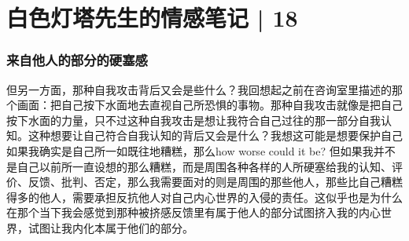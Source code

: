\chapter{白色灯塔先生的情感笔记 | 18}






















\subsection*{来自他人的部分的硬塞感}

但另一方面，那种自我攻击背后又会是些什么？我回想起之前在咨询室里描述的那个画面：把自己按下水面地去直视自己所恐惧的事物。那种自我攻击就像是把自己按下水面的力量，只不过这种自我攻击是想让我符合自己过往的那一部分自我认知。这种想要让自己符合自我认知的背后又会是什么？我想这可能是想要保护自己\pozhehao{}如果我确实是自己所一如既往地糟糕，那么how worse could it be? 但如果我并不是自己以前所一直设想的那么糟糕，而是周围各种各样的人所硬塞给我的认知、评价、反馈、批判、否定，那么我需要面对的则是周围的那些他人，那些比自己糟糕得多的他人，需要承担反抗他人对自己内心世界的入侵的责任。这似乎也是为什么在那个当下我会感觉到那种被挤感\pozhehao{}反馈里有属于他人的部分试图挤入我的内心世界，试图让我内化本属于他们的部分。







